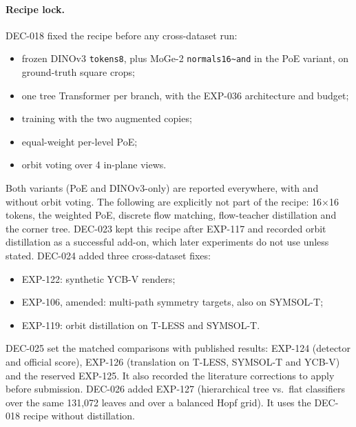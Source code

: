 \paragraph{Recipe lock.}
DEC-018 fixed the recipe before any cross-dataset run:
\begin{itemize}
  \item frozen DINOv3 \texttt{tokens8}, plus MoGe-2 \texttt{normals16\textasciitilde and} in the PoE variant, on ground-truth square crops;
  \item one tree Transformer per branch, with the EXP-036 architecture and budget;
  \item training with the two augmented copies;
  \item equal-weight per-level PoE;
  \item orbit voting over 4 in-plane views.
\end{itemize}
Both variants (PoE and DINOv3-only) are reported everywhere, with and without orbit voting. The following are explicitly not part of the recipe: 16$\times$16 tokens, the weighted PoE, discrete flow matching, flow-teacher distillation and the corner tree.
DEC-023 kept this recipe after EXP-117 and recorded orbit distillation as a successful add-on, which later experiments do not use unless stated.
DEC-024 added three cross-dataset fixes:
\begin{itemize}
  \item EXP-122: synthetic YCB-V renders;
  \item EXP-106, amended: multi-path symmetry targets, also on SYMSOL-T;
  \item EXP-119: orbit distillation on T-LESS and SYMSOL-T.
\end{itemize}
DEC-025 set the matched comparisons with published results: EXP-124 (detector and official score), EXP-126 (translation on T-LESS, SYMSOL-T and YCB-V) and the reserved EXP-125. It also recorded the literature corrections to apply before submission.
DEC-026 added EXP-127 (hierarchical tree vs.\ flat classifiers over the same 131{,}072 leaves and over a balanced Hopf grid). It uses the DEC-018 recipe without distillation.

